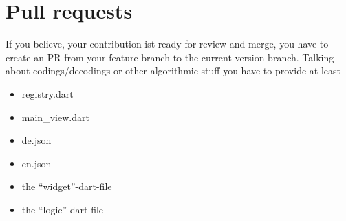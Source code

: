 \section{Pull requests}
If you believe, your contribution ist ready for review and merge, you have to create an PR from your feature branch to the current version branch. Talking about codings/decodings or other algorithmic stuff you have to provide at least
\begin{itemize}
    \item registry.dart
    \item main\_view.dart
    \item de.json
    \item en.json
    \item the \enquote{widget}-dart-file
    \item the \enquote{logic}-dart-file
\end{itemize}
